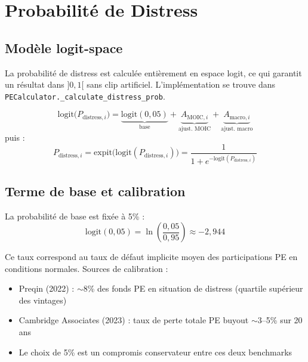 \documentclass[12pt,a4paper]{article}
\begin{document}
\section{Probabilit\'{e} de Distress}
\label{sec:distress}

\subsection{Mod\`{e}le logit-space}

La probabilit\'{e} de distress est calcul\'{e}e enti\`{e}rement en espace logit, ce qui garantit
un r\'{e}sultat dans $]0, 1[$ sans clip artificiel. L'impl\'{e}mentation se trouve dans
\texttt{PECalculator.\_calculate\_distress\_prob}.

\begin{formulebox}
\begin{equation}
\label{eq:distress_logit}
\mathrm{logit}\bigl(P_{\mathrm{distress},i}\bigr)
= \underbrace{\mathrm{logit}(0{,}05)}_{\text{base}}
+ \underbrace{A_{\mathrm{MOIC},i}}_{\text{ajust. MOIC}}
+ \underbrace{A_{\mathrm{macro},i}}_{\text{ajust. macro}}
\end{equation}
puis :
\begin{equation}
P_{\mathrm{distress},i} = \mathrm{expit}\bigl(\mathrm{logit}(P_{\mathrm{distress},i})\bigr)
= \frac{1}{1 + e^{-\mathrm{logit}(P_{\mathrm{distress},i})}}
\end{equation}
\end{formulebox}

\subsection{Terme de base et calibration}

La probabilit\'{e} de base est fix\'{e}e \`{a} 5\% :
\begin{equation}
\mathrm{logit}(0{,}05) = \ln\!\left(\frac{0{,}05}{0{,}95}\right) \approx -2{,}944
\end{equation}

\begin{definitionbox}[Calibration : P(distress) base = 5\%]
Ce taux correspond au taux de d\'{e}faut implicite moyen des participations PE en conditions normales.
Sources de calibration :
\begin{itemize}[nosep]
    \item Preqin (2022) : $\sim$8\% des fonds PE en situation de distress (quartile sup\'{e}rieur des vintages)
    \item Cambridge Associates (2023) : taux de perte totale PE buyout $\sim$3--5\% sur 20 ans
    \item Le choix de 5\% est un compromis conservateur entre ces deux benchmarks
\end{itemize}
\end{definitionbox}
\end{document}
